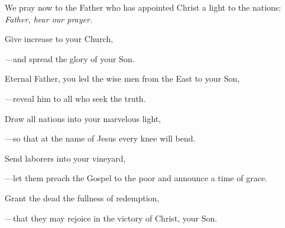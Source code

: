 \intercessions\indent

\begin{hangpar}

We pray now to the Father who has appointed Christ a light to the nations:\\
\emph{Father, hear our prayer.}

\medskip Give increase to your Church,

{\color{red}---\thinspace}and spread the glory of your Son.

\medskip Eternal Father, you led the wise men from the East to your Son,

{\color{red}---\thinspace}reveal him to all who seek the truth.

\medskip Draw all nations into your marvelous light,

{\color{red}---\thinspace}so that at the name of Jesus every knee will bend.

\medskip Send laborers into your vineyard,

{\color{red}---\thinspace}let them preach the Gospel to the poor and announce a time of grace.

\medskip Grant the dead the fullness of redemption,

{\color{red}---\thinspace}that they may rejoice in the victory of Christ, your Son.

\medskip

\end{hangpar}